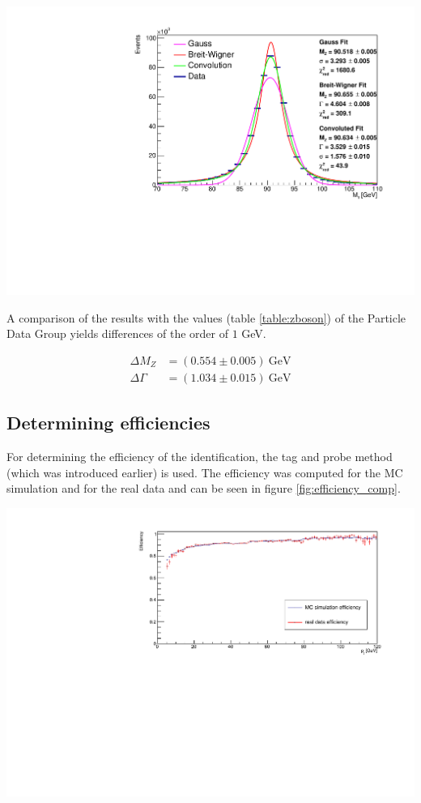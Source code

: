 \documentclass[12pt, a4paper, bibliography=totoc]{scrartcl}
\begin{document}
\begin{multicols}{2}
\begin{center}
	\includegraphics[width=\linewidth]{fig/invar_z_mass.pdf}
	\label{fig:fit}
\end{center}

A comparison of the results with the values (table \ref{table:zboson}) of the Particle Data Group yields differences of the order of $1$ GeV.
 
\begin{align}
\Delta M_Z &= (0.554 \pm 0.005) \ \text{GeV}\\
\Delta \Gamma &= (1.034 \pm 0.015) \ \text{GeV}
\end{align}
 
\subsection{Determining efficiencies}
For determining the efficiency of the identification, the tag and probe method (which was introduced earlier) is used.
The efficiency was computed for the MC simulation and for the real data and can be seen in figure \ref{fig:efficiency_comp}.

\begin{center}
    \includegraphics[width=1.1\linewidth]{fig/efficency_comparison_v2.pdf}
    \label{fig:efficiency_comp}
\end{center}


\end{multicols}
\end{document}
